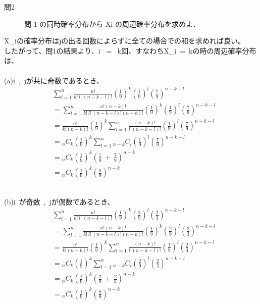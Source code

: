 \documentclass[12pt,a4paper]{jsarticle}
\begin{document}
\begin{description}
    \item [問2] 問 1 の同時確率分布から Xi の周辺確率分布を求めよ．
\end{description}

X_{i}の確率分布はjの出る回数によらずに全ての場合での和を求めれば良い。\\
したがって、問1の結果より、i ~=~ k回、すなわちX_{i}~=~kの時の周辺確率分布は、\\

~\\
(a)i~,~jが共に奇数であるとき、\\
\begin{align*}
    & \sum^n_{l = 1} \frac{n!}{k!~l!~(n-k-l)!} \left(\frac{1}{9}\right)^k \left(\frac{1}{9}\right)^l \left(\frac{7}{9}\right)^{n-k-l} \\
    &= \sum^n_{l = 1} \frac{n!(n-k)!}{k!~l!~(n-k-l)!(n-k)!} \left(\frac{1}{9}\right)^k \left(\frac{1}{9}\right)^l \left(\frac{7}{9}\right)^{n-k-l} \\
    &= \frac{n!}{k!(n-k)!}\left(\frac{1}{9}\right)^k \sum^n_{l = 1}\frac{(n-k)!}{l!(n-k-l)!}\left(\frac{1}{9}\right)^l\left(\frac{7}{9}\right)^{n-k-l} \\
    &= {}_n C_k \left(\frac{1}{9}\right)^k \sum^n_{l = 1} {}_{n-k} C_l \left(\frac{1}{9}\right)^l\left(\frac{7}{9}\right)^{n-k-l} \\
    &= {}_n C_k \left(\frac{1}{9}\right)^k \left(\frac{1}{9}~+~\frac{7}{9}\right)^{n-k} \\
    &= {}_n C_k \left(\frac{1}{9}\right)^k \left(\frac{8}{9}\right)^{n-k}
\end{align*}

~\\
(b)i~が奇数~,~jが偶数であるとき、\\
\begin{align*}
    & \sum^n_{l = 1} \frac{n!}{k!~l!~(n-k-l)!} \left(\frac{1}{9}\right)^k \left(\frac{2}{9}\right)^l \left(\frac{2}{3}\right)^{n-k-l} \\
    &= \sum^n_{l = 1} \frac{n!(n-k)!}{k!~l!~(n-k-l)!(n-k)!} \left(\frac{1}{9}\right)^k \left(\frac{2}{9}\right)^l \left(\frac{2}{3}\right)^{n-k-l} \\
    &= \frac{n!}{k!(n-k)!}\left(\frac{1}{9}\right)^k \sum^n_{l = 1}\frac{(n-k)!}{l!(n-k-l)!}\left(\frac{1}{9}\right)^l\left(\frac{2}{3}\right)^{n-k-l} \\
    &= {}_n C_k \left(\frac{1}{9}\right)^k \sum^n_{l = 1} {}_{n-k} C_l \left(\frac{2}{9}\right)^l\left(\frac{2}{3}\right)^{n-k-l} \\
    &= {}_n C_k \left(\frac{1}{9}\right)^k \left(\frac{2}{9}~+~\frac{2}{3}\right)^{n-k} \\
    &= {}_n C_k \left(\frac{1}{9}\right)^k \left(\frac{8}{9}\right)^{n-k}
\end{align*}
\end{document}
